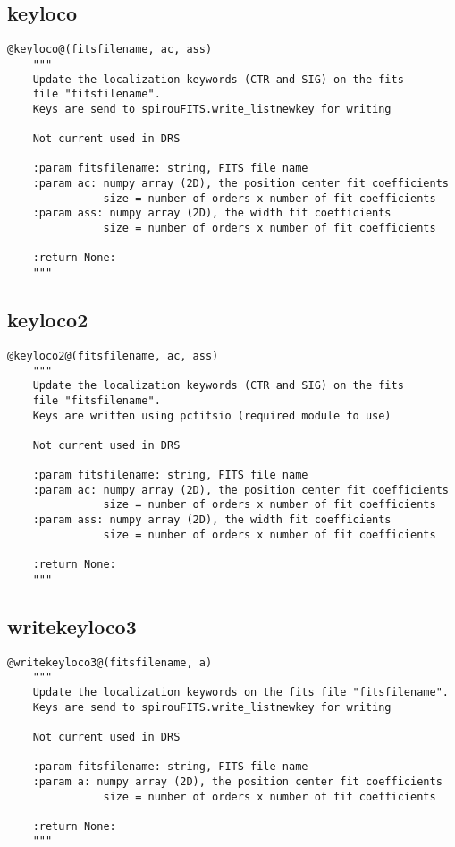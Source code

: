 \vspace{0.5cm}
\subsection{keyloco}
\begin{lstlisting}[style=pythonstyle]
@keyloco@(fitsfilename, ac, ass)
    """
    Update the localization keywords (CTR and SIG) on the fits
    file "fitsfilename".
    Keys are send to spirouFITS.write_listnewkey for writing

    Not current used in DRS

    :param fitsfilename: string, FITS file name
    :param ac: numpy array (2D), the position center fit coefficients
               size = number of orders x number of fit coefficients
    :param ass: numpy array (2D), the width fit coefficients
               size = number of orders x number of fit coefficients

    :return None:
    """
\end{lstlisting}

\vspace{0.5cm}
\subsection{keyloco2}
\begin{lstlisting}[style=pythonstyle]
@keyloco2@(fitsfilename, ac, ass)
    """
    Update the localization keywords (CTR and SIG) on the fits
    file "fitsfilename".
    Keys are written using pcfitsio (required module to use)

    Not current used in DRS

    :param fitsfilename: string, FITS file name
    :param ac: numpy array (2D), the position center fit coefficients
               size = number of orders x number of fit coefficients
    :param ass: numpy array (2D), the width fit coefficients
               size = number of orders x number of fit coefficients

    :return None:
    """
\end{lstlisting}

\vspace{0.5cm}
\subsection{writekeyloco3}
\begin{lstlisting}[style=pythonstyle]
@writekeyloco3@(fitsfilename, a)
    """
    Update the localization keywords on the fits file "fitsfilename".
    Keys are send to spirouFITS.write_listnewkey for writing

    Not current used in DRS

    :param fitsfilename: string, FITS file name
    :param a: numpy array (2D), the position center fit coefficients
               size = number of orders x number of fit coefficients

    :return None:
    """
\end{lstlisting}

